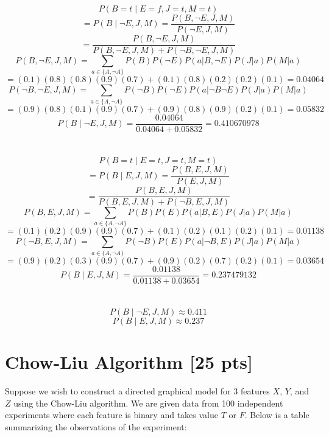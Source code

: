 \documentclass[a4paper]{article}
\theoremstyle{definition}
\newenvironment{soln}{
	\leavevmode\color{blue}\ignorespaces
}{}
\begin{document}
\begin{soln}
	$$P(B=t \mid E=f,J=t,M=t)$$
	$$ = P(B \mid \neg E, J, M) = \frac{P(B, \neg E, J, M)}{P(\neg E, J, M)}$$
	$$ = \frac{P(B, \neg E, J, M)}{P(B, \neg E, J, M) + P(\neg B, \neg E, J, M)}$$
	$$P(B, \neg E, J, M) = \sum_{a \in \{A, \neg A\}} P(B) P(\neg E) P(a | B, \neg E) P(J | a) P(M | a)$$
	$$ = (0.1)(0.8)(0.8)(0.9)(0.7) + (0.1)(0.8)(0.2)(0.2)(0.1) = 0.04064$$
	$$P(\neg B, \neg E, J, M) = \sum_{a \in \{A, \neg A\}} P(\neg B) P(\neg E) P(a | \neg B \neg E) P(J | a) P(M | a)$$
	$$ = (0.9)(0.8)(0.1)(0.9)(0.7) + (0.9)(0.8)(0.9)(0.2)(0.1) = 0.05832$$
	$$P(B \mid \neg E, J, M) = \frac{0.04064}{0.04064 + 0.05832} = 0.410670978$$
	\\ \\
	$$P(B=t \mid E=t,J=t,M=t)$$
	$$ = P(B \mid E, J, M) = \frac{P(B, E, J, M)}{P(E, J, M)}$$
	$$ = \frac{P(B, E, J, M)}{P(B, E, J, M) + P(\neg B, E, J, M)}$$
	$$P(B, E, J, M) = \sum_{a \in \{A, \neg A\}} P(B) P(E) P(a | B, E) P(J | a) P(M | a)$$
	$$ = (0.1)(0.2)(0.9)(0.9)(0.7) + (0.1)(0.2)(0.1)(0.2)(0.1) = 0.01138$$
	$$P(\neg B, E, J, M) = \sum_{a \in \{A, \neg A\}} P(\neg B) P(E) P(a | \neg B, E) P(J | a) P(M | a)$$
	$$ = (0.9)(0.2)(0.3)(0.9)(0.7) + (0.9)(0.2)(0.7)(0.2)(0.1) = 0.03654$$
	$$P(B \mid E, J, M) = \frac{0.01138}{0.01138 + 0.03654} = 0.237479132$$
	\\ \\
	$$P(B \mid \neg E, J, M) \approx 0.411$$
	$$P(B \mid E, J, M) \approx 0.237$$
\end{soln}


\section{Chow-Liu Algorithm [25 pts]}
Suppose we wish to construct a directed graphical model for 3 features $X$, $Y$, and $Z$ using the Chow-Liu algorithm. We are given data from 100 independent experiments where each feature is binary and takes value $T$ or $F$. Below is a table summarizing the observations of the experiment:
\end{document}

